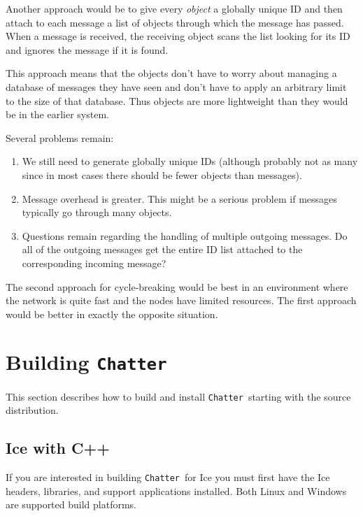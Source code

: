 \documentclass[twocolumn]{article}
\newcommand{\Chatter}{\texttt{Chatter}}
\begin{document}
Another approach would be to give every \emph{object} a globally unique ID and then attach to
each message a list of objects through which the message has passed. When a message is received,
the receiving object scans the list looking for its ID and ignores the message if it is found.

This approach means that the objects don't have to worry about managing a database of messages
they have seen and don't have to apply an arbitrary limit to the size of that database. Thus
objects are more lightweight than they would be in the earlier system.

Several problems remain:

\begin{enumerate}

\item We still need to generate globally unique IDs (although probably not as many since in most
  cases there should be fewer objects than messages).

\item Message overhead is greater. This might be a serious problem if messages typically go
  through many objects.

\item Questions remain regarding the handling of multiple outgoing messages. Do all of the
  outgoing messages get the entire ID list attached to the corresponding incoming message?

\end{enumerate}

The second approach for cycle-breaking would be best in an environment where the network is
quite fast and the nodes have limited resources. The first approach would be better in exactly
the opposite situation.

\section{Building \Chatter}

This section describes how to build and install \Chatter\ starting with the source distribution.

\subsection{Ice with C++}

If you are interested in building \Chatter\ for Ice you must first have the Ice headers,
libraries, and support applications installed. Both Linux and Windows are supported build
platforms.
\end{document}
